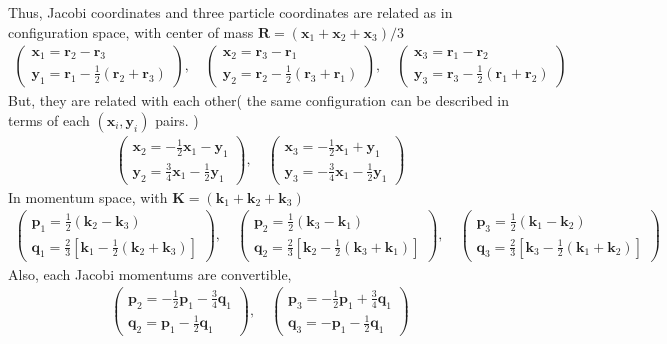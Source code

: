 \documentclass[11pt]{article}
\def\bm{\boldsymbol}
\newcommand{\bea}{\begin{eqnarray}}
\newcommand{\eea}{\end{eqnarray}}
\newcommand{\vp}{{\bm p}}
\newcommand{\vq}{{\bm q}}
\newcommand{\vk}{{\bm k}}
\newcommand{\vx}{{\bm x}}
\newcommand{\vy}{{\bm y}}
\newcommand{\vr}{{\bm r}}
\begin{document}
Thus, Jacobi coordinates and three particle coordinates are related 
as in configuration space, with center of mass ${\bm R}=(\vx_1+\vx_2+\vx_3)/3$
\bea
  \left(\begin{array}{c} \vx_1=\vr_2-\vr_3 
      \\ \vy_1=\vr_1-\frac{1}{2} (\vr_2+\vr_3) 
  \end{array}\right)
  ,\quad
  \left(\begin{array}{c} \vx_2=\vr_3-\vr_1 
      \\ \vy_2=\vr_2-\frac{1}{2} (\vr_3+\vr_1) 
  \end{array}\right)
  ,\quad
  \left(\begin{array}{c} \vx_3=\vr_1-\vr_2 
      \\ \vy_3=\vr_3-\frac{1}{2} (\vr_1+\vr_2) 
  \end{array}\right)
\eea
But, they are related with each other( the same configuration can be described in terms of 
each $(\vx_i,\vy_i)$ pairs. )
\bea
  \left(\begin{array}{c}
  \vx_2=-\frac{1}{2}\vx_1-\vy_1\\
  \vy_2=\frac{3}{4}\vx_1-\frac{1}{2}\vy_1
  \end{array}\right),\quad
  \left(\begin{array}{c}
  \vx_3=-\frac{1}{2}\vx_1+\vy_1\\ 
  \vy_3=-\frac{3}{4}\vx_1-\frac{1}{2}\vy_1 
  \end{array}\right)
\eea
In momentum space, with ${\bm K}=(\vk_1+\vk_2+\vk_3)$
\bea
  \left(\begin{array}{c} \vp_1=\frac{1}{2}(\vk_2-\vk_3) 
      \\ \vq_1=\frac{2}{3}[\vk_1-\frac{1}{2} (\vk_2+\vk_3)] 
  \end{array}\right)
  ,\quad
   \left(\begin{array}{c} \vp_2=\frac{1}{2}(\vk_3-\vk_1) 
      \\ \vq_2=\frac{2}{3}[\vk_2-\frac{1}{2} (\vk_3+\vk_1)] 
  \end{array}\right)
  ,\quad
   \left(\begin{array}{c} \vp_3=\frac{1}{2}(\vk_1-\vk_2) 
      \\ \vq_3=\frac{2}{3}[\vk_3-\frac{1}{2} (\vk_1+\vk_2)] 
  \end{array}\right)
\eea
Also, each Jacobi momentums are convertible,
\bea
  \left(\begin{array}{c}
  \vp_2=-\frac{1}{2}\vp_1-\frac{3}{4}\vq_1\\
  \vq_2=\vp_1-\frac{1}{2}\vq_1
  \end{array}\right),\quad
  \left(\begin{array}{c}
  \vp_3=-\frac{1}{2}\vp_1+\frac{3}{4}\vq_1\\ 
  \vq_3=-\vp_1-\frac{1}{2}\vq_1 
  \end{array}\right)
\eea
\end{document}
